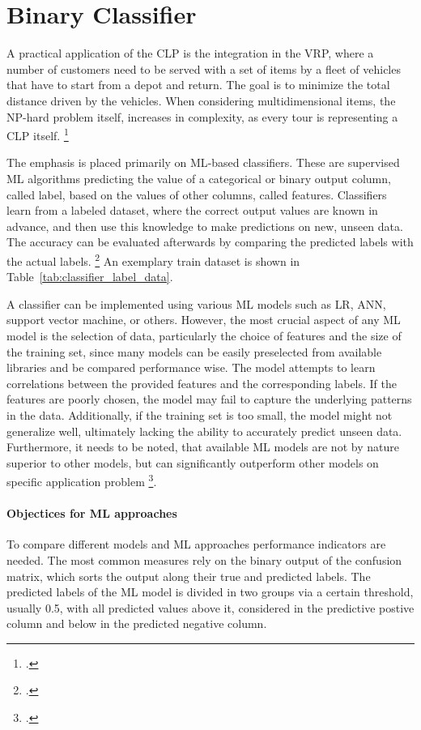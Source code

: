 \chapter{Binary Classifier}
\label{chap:classifier}

A practical application of the \gls{CLP} is the integration in the \gls{VRP}, where
a number of customers need to be served with a set of items by a fleet of vehicles that have
to start from a depot and return. The goal is to minimize the total distance driven
by the vehicles. When considering multidimensional items, the NP-hard problem itself,
increases in complexity, as every tour is representing a \gls{CLP} itself. \footcite[cf.][pp. 1--2]{tamke_branch-and-cut_2024}

The emphasis is placed primarily on \gls{ML}-based classifiers.
These are supervised \gls{ML} algorithms predicting the
value of a categorical or binary output column, called label, based on the
values of other columns, called features. Classifiers learn from a labeled dataset,
where the correct output values are known in advance, and then use this knowledge to
make predictions on new, unseen data. The accuracy can be evaluated afterwards by comparing
the predicted labels with the actual labels. \footcite[cf.][]{kotsiantis_supervised_2007}
An exemplary train dataset is shown in Table~\ref{tab:classifier_label_data}.



A classifier can be implemented using various \gls{ML} models such as \gls{LR},
\gls{ANN}, support vector machine, or others. However, the most crucial aspect of any
\gls{ML} model is the selection of data, particularly the choice of features and
the size of the training set, since many models can be easily preselected from available
libraries and be compared performance wise. The model attempts to learn correlations between the provided features
and the corresponding labels. If the features are poorly chosen, the model may fail
to capture the underlying patterns in the data. Additionally, if the training set
is too small, the model might not generalize well, ultimately lacking the ability
to accurately predict unseen data. Furthermore, it needs to be noted, that available
\gls{ML} models are not by nature superior to other models, but can significantly outperform
other models on specific application problem \footcite[cf.][pp. 250, 264]{kotsiantis_supervised_2007}.


\subsubsection{Objectices for ML approaches}
To compare different models and \gls{ML} approaches performance indicators are needed. The most common
measures rely on the binary output of the confusion matrix, which sorts the output along
their true and predicted labels. The predicted labels of the \gls{ML} model is divided in two groups via a certain threshold, usually 0.5, with all predicted values above it, considered in the predictive postive column and below in the predicted negative column.

